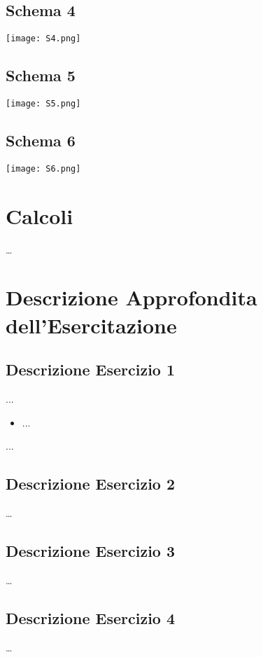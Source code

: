 \documentclass[a4paper]{article}
\begin{document}
\subsection{Schema 4}
\begin{center}
\texttt{[image: S4.png]}
\end{center}

\subsection{Schema 5}
\begin{center}
\texttt{[image: S5.png]}
\end{center}

\subsection{Schema 6}
\begin{center}
\texttt{[image: S6.png]}
\end{center}


\section{Calcoli}
\dots


\section{Descrizione Approfondita dell'Esercitazione}
\subsection{Descrizione Esercizio 1}
...
\begin{itemize}
\item ...
\end{itemize}
...

\subsection{Descrizione Esercizio 2}
\dots

\subsection{Descrizione Esercizio 3}
\dots

\subsection{Descrizione Esercizio 4}
\dots
\end{document}
